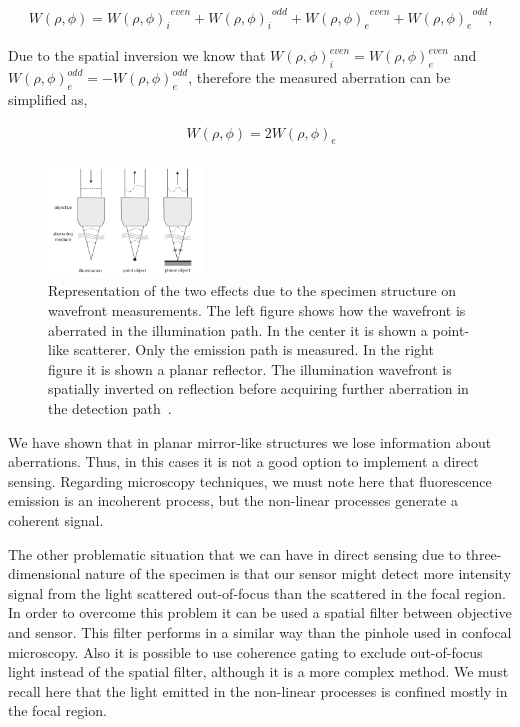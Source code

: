 \begin{align}
	\ W(\rho,\phi) = {{W(\rho,\phi)_i}^{even}} + {{W(\rho,\phi)_i}^{odd}}+{{W(\rho,\phi)_e}^{even}} + {{W(\rho,\phi)_e}^{odd}},
	\label{eq:aberration_sum_il_em}
\end{align}  

Due to the spatial inversion we know that $W(\rho,\phi)_i^{even}=W(\rho,\phi)_e^{even}$ and $W(\rho,\phi)_e^{odd}=-W(\rho,\phi)_e^{odd}$, therefore the measured aberration can be simplified as,  

\begin{align}
	\ W(\rho,\phi)=2 {{W(\rho,\phi)_e}}
	\label{eq:ab_measured_spat_inver}
\end{align} 
 

\begin{figure}[htbp]
	\centering
		\includegraphics[width=0.37\textwidth, height=0.15\textheight]{images/abe_direct_sensing.png}
	\caption{Representation of the two effects due to the specimen structure on wavefront measurements. The left figure shows how the wavefront is aberrated in the illumination path. In the center it is shown a point-like scatterer. Only the emission path is measured. In the right figure it is shown a planar reflector. The illumination wavefront is spatially inverted on reflection before acquiring further aberration in the detection path~\cite{AOM_basic_ref}.}
	\label{fig:abe_direct_sensing}
\end{figure}


We have shown that in planar mirror-like structures we lose information about aberrations. Thus, in this cases it is not a good option to implement a direct sensing. Regarding microscopy techniques, we must note here that fluorescence emission is an incoherent process, but the non-linear processes generate a coherent signal.

The other problematic situation that we can have in direct sensing due to three-dimensional nature of the specimen is that our sensor might detect more intensity signal from the light scattered out-of-focus than the scattered in the focal region. In order to overcome this problem it can be used a spatial filter between objective and sensor. This filter performs in a similar way than the pinhole used in confocal microscopy. Also it is possible to use coherence gating to exclude out-of-focus light instead of the spatial filter, although it is a more complex method. We must recall here that the light emitted in the non-linear processes is confined mostly in the focal region.

